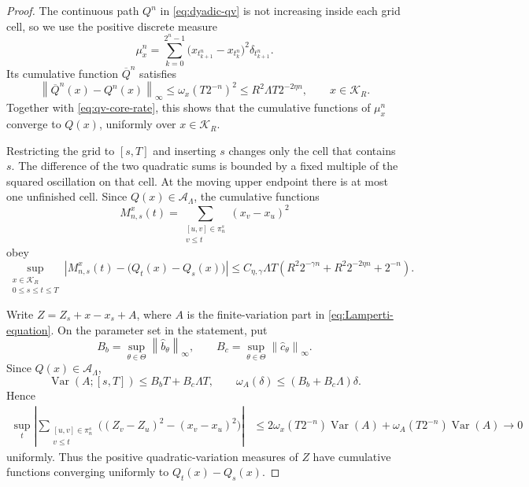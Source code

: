 \documentclass[11pt,reqno]{amsart}
\theoremstyle{plain}
\theoremstyle{definition}
\newcommand{\cK}{\mathcal K}
\newcommand{\Var}{\operatorname{Var}}
\newcommand{\norm}[1]{\left\lVert #1\right\rVert}
\newcommand{\abs}[1]{\left\lvert #1\right\rvert}
\begin{document}
\begin{proof}
The continuous path \(Q^n\) in \eqref{eq:dyadic-qv} is not increasing inside
each grid cell, so we use the positive discrete measure
\[
  \mu_x^n
  =
  \sum_{k=0}^{2^n-1}
  \bigl(x_{t_{k+1}^n}-x_{t_k^n}\bigr)^2
  \delta_{t_{k+1}^n}.
\]
Its cumulative function \(\overline Q^n\) satisfies
\[
  \norm{\overline Q^n(x)-Q^n(x)}_\infty
  \le\omega_x(T2^{-n})^2
  \le R^2\Lambda T2^{-2\eta n},
  \qquad x\in\cK_R.
\]
Together with \eqref{eq:qv-core-rate}, this shows that the cumulative
functions of \(\mu_x^n\) converge to \(Q(x)\), uniformly over
\(x\in\cK_R\).

Restricting the grid to \([s,T]\) and inserting \(s\) changes only the cell
that contains \(s\).  The difference of the two quadratic sums is bounded by
a fixed multiple of the squared oscillation on that cell.  At the moving
upper endpoint there is at most one unfinished cell.  Since
\(Q(x)\in\mathcal A_\Lambda\), the cumulative functions
\[
  M_{n,s}^x(t)
  =
  \sum_{\substack{[u,v]\in\pi_n^s\\v\le t}}
  (x_v-x_u)^2
\]
obey
\begin{equation}\label{eq:inserted-point-qv-rate}
  \sup_{\substack{x\in\cK_R\\0\le s\le t\le T}}
  \abs{
    M_{n,s}^x(t)-\bigl(Q_t(x)-Q_s(x)\bigr)
  }
  \le
  C_{\eta,\gamma}\Lambda T
  \left(
    R^2 2^{-\gamma n}
    +R^2 2^{-2\eta n}
    +2^{-n}
  \right).
\end{equation}

Write \(Z=Z_s+x-x_s+A\), where \(A\) is the finite-variation part in
\eqref{eq:Lamperti-equation}.  On the parameter set in the statement,
put
\[
  B_b=\sup_{\theta\in\Theta}\norm{\widehat b_\theta}_\infty,
  \qquad
  B_c=\sup_{\theta\in\Theta}\norm{\widehat c_\theta}_\infty.
\]
Since \(Q(x)\in\mathcal A_\Lambda\),
\begin{equation}\label{eq:A-variation-modulus}
  \Var(A;[s,T])\le B_bT+B_c\Lambda T,
  \qquad
  \omega_A(\delta)\le(B_b+B_c\Lambda)\delta.
\end{equation}
Hence
\begin{align*}
  \sup_t
  \left|
    \sum_{\substack{[u,v]\in\pi_n^s\\v\le t}}
      \bigl((Z_v-Z_u)^2-(x_v-x_u)^2\bigr)
  \right|
  &\le
  2\omega_x(T2^{-n})\Var(A)
  +\omega_A(T2^{-n})\Var(A)
  \longrightarrow0
\end{align*}
uniformly.  Thus the positive quadratic-variation measures of \(Z\) have
cumulative functions converging uniformly to \(Q_t(x)-Q_s(x)\).


\end{proof}
\end{document}

